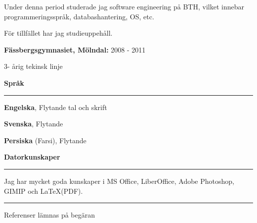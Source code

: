 \documentclass[12pt , a4paper]{article}
\begin{document}
\begin{flushleft}
		\vspace{3pt}
				
		Under denna period studerade jag software engineering på BTH,
		vilket innebar programmeringsspråk, databashantering, OS, etc. 
		
		
		För tillfället har jag studieuppehåll.
		
		\vspace{6pt}
		
		\textbf{Fässbergsgymnasiet, Mölndal: } 2008 - 2011
		
		3- årig tekinsk linje


	
		
		\vspace{12pt}
		{\large \textbf{Språk}}
		\hrule
		\vspace{12pt}

		\textbf{Engelska}, Flytande tal och skrift

		\textbf{Svenska}, Flytande		
		
		\textbf{Persiska} (Farsi), Flytande 

		
		\vspace{12pt}
		{\large \textbf{Datorkunskaper}}
		\hrule
		\vspace{12pt}
		Jag har mycket goda kunskaper i MS Office, LiberOffice, Adobe Photoshop, GIMIP och LaTeX(PDF).
		\vspace{6pt}		
		\hrule
		\vspace{6pt}		
		
		Referenser lämnas på begäran

	\end{flushleft}		
	
	
\end{document}
